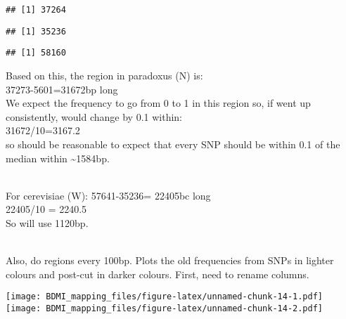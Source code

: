 \documentclass[
]{article}
\newenvironment{Shaded}{\begin{snugshade}}{\end{snugshade}}
\newcommand{\FunctionTok}[1]{\textcolor[rgb]{0.13,0.29,0.53}{\textbf{#1}}}
\newcommand{\NormalTok}[1]{#1}
\newcommand{\SpecialCharTok}[1]{\textcolor[rgb]{0.81,0.36,0.00}{\textbf{#1}}}
\begin{document}
\begin{Shaded}
\end{Shaded}

\begin{verbatim}
## [1] 37264
\end{verbatim}

\begin{Shaded}
\end{Shaded}

\begin{verbatim}
## [1] 35236
\end{verbatim}

\begin{Shaded}
\end{Shaded}

\begin{verbatim}
## [1] 58160
\end{verbatim}

Based on this, the region in paradoxus (N) is:\\
37273-5601=31672bp long\\
We expect the frequency to go from 0 to 1 in this region so, if went up
consistently, would change by 0.1 within:\\
31672/10=3167.2\\
so should be reasonable to expect that every SNP should be within 0.1 of
the median within \textasciitilde1584bp.\\
\strut \\
For cerevisiae (W): 57641-35236= 22405bc long\\
22405/10 = 2240.5\\
So will use 1120bp.\\
\strut \\
Also, do regions every 100bp. Plots the old frequencies from SNPs in
lighter colours and post-cut in darker colours. First, need to rename
columns.

\texttt{[image: BDMI\_mapping\_files/figure-latex/unnamed-chunk-14-1.pdf]}
\texttt{[image: BDMI\_mapping\_files/figure-latex/unnamed-chunk-14-2.pdf]}
\end{document}
